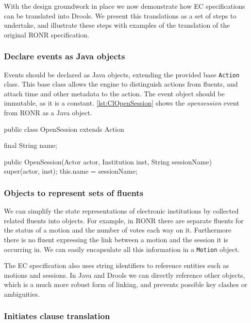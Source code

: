 With the design groundwork in place we now demonstrate how \ac{EC}
specifications can be translated into Drools. We present this translations as a
set of steps to undertake, and illustrate these steps with examples of the
translation of the original \ac{RONR} specification.

\subsubsection*{Declare events as Java objects}

Events should be declared as Java objects, extending the provided base
\texttt{Action} class. This base class allows the engine to distinguish
actions from fluents, and attach time and other metadata to the action. The
event object should be immutable, as it is a constant. \autoref{lst:ClOpenSession}
shows the \emph{opensession} event from \ac{RONR} as a Java object. 

\begin{java}[label=lst:ClOpenSession,caption=OpenSession action as a Java object]
public class OpenSession extends Action {

	final String name;
	
	public OpenSession(Actor actor, Institution inst, String sessionName) {
		super(actor, inst);
		this.name = sessionName;
	}
}
\end{java}

\subsubsection*{Objects to represent sets of fluents}

We can simplify the state representations of electronic institutions by collected
related fluents into objects. For example, in \ac{RONR} there are separate
fluents for the status of a motion and the number of votes each way on it.
Furthermore there is no fluent expressing the link between a motion and the
session it is occurring in. We can easily encapsulate all this information in a
\texttt{Motion} object. 

The \ac{EC} specification also uses string identifiers to reference entities
such as motions and sessions. In Java and Drools we can directly reference other
objects, which is a much more robust form of linking, and prevents possible key
clashes or ambiguities.

\subsubsection*{Initiates clause translation}

